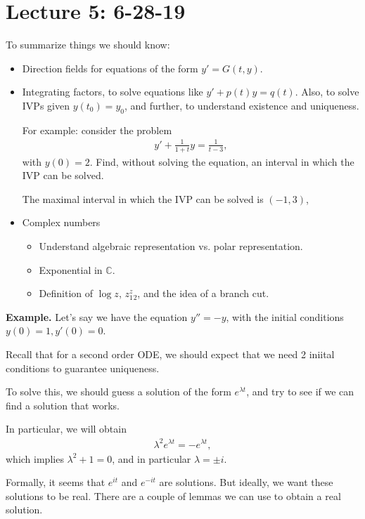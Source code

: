 \documentclass{article}
\begin{document}
\section{Lecture 5: 6-28-19}

To summarize things we should know:

\begin{itemize}
  \item Direction fields for equations of the form $y' = G(t, y)$.
  \item Integrating factors, to solve equations like $y' + p(t) y = q(t)$. Also, to solve IVPs given $y(t_0) = y_0$, and further, to understand existence and uniqueness.

    For example: consider the problem
    \begin{align*}
      y' + \frac{1}{1+t}y = \frac{1}{t-3},
    \end{align*}
    with $y(0) = 2$.  Find, without solving the equation, an interval in which the IVP can be solved.

    The maximal interval in which the IVP can be solved is $(-1, 3)$, 
    
  \item Complex numbers
    \begin{itemize}
      \item Understand algebraic representation vs. polar representation.
      \item Exponential in $\mathbb{C}$.
      \item Definition of $\log z$, $z_1^z_2$, and the idea of a branch cut.
    \end{itemize} 
\end{itemize}

{\bf Example.} Let's say we have the equation $y'' = -y$, with the initial conditions $y(0) = 1, y'(0) = 0$.

Recall that for a second order ODE, we should expect that we need 2 iniital conditions to guarantee uniqueness.

To solve this, we should guess a solution of the form $e^{\lambda t}$, and try to see if we can find a solution that works.

In particular, we will obtain
\begin{align*}
  \lambda^2 e^{\lambda t} = - e^{\lambda t},
\end{align*}
which implies $\lambda^2 + 1 = 0$, and in particular $\lambda = \pm i$.

Formally, it seems that $e^{it}$ and $e^{- it}$ are solutions.  But ideally, we want these solutions to be real.  There are a couple of lemmas we can use to obtain a real solution.
\end{document}
